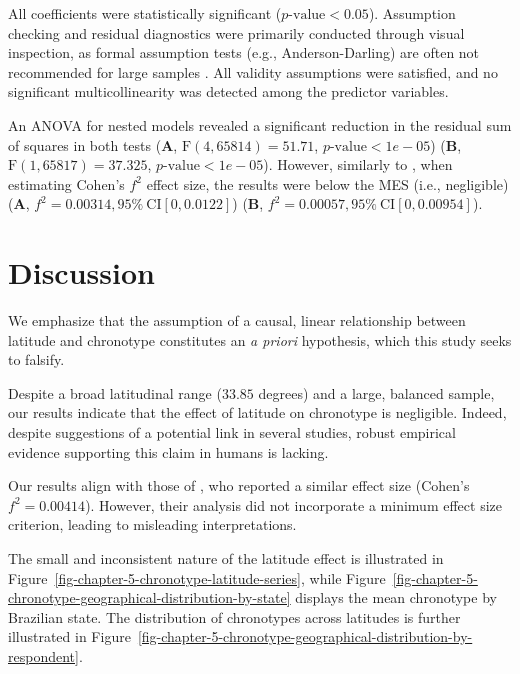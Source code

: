 \documentclass[
12pt,
openright,
oneside,
a4paper,
chapter=TITLE,
section=TITLE,
french,
spanish,
brazil,
english
]{abntex2}
\begin{document}
All coefficients were statistically significant
(\(p\text{-value} < 0.05\)). Assumption checking and residual
diagnostics were primarily conducted through visual inspection, as
formal assumption tests (e.g., Anderson-Darling) are often not
recommended for large samples \autocite{shatz2024}. All validity
assumptions were satisfied, and no significant multicollinearity was
detected among the predictor variables.

An ANOVA for nested models revealed a significant reduction in the
residual sum of squares in both tests (\textbf{A},
\(\text{F}(4, 65814) = 51.71\), \(p\text{-value} < 1e-05\)) (\textbf{B},
\(\text{F}(1, 65817) = 37.325\), \(p\text{-value} < 1e-05\)). However,
similarly to \textcite{leocadio-miguel2017}, when estimating Cohen's
\(f^2\) effect size, the results were below the MES (i.e., negligible)
(\textbf{A}, \(f^2 = 0.00314, 95\% \ \text{CI}[0, 0.0122]\))
(\textbf{B}, \(f^2 = 0.00057, 95\% \ \text{CI}[0, 0.00954]\)).

\section{Discussion}\label{discussion}

We emphasize that the assumption of a causal, linear relationship
between latitude and chronotype constitutes an \emph{a priori}
hypothesis, which this study seeks to falsify.

Despite a broad latitudinal range (\(33.85\) degrees) and a large,
balanced sample, our results indicate that the effect of latitude on
chronotype is negligible. Indeed, despite suggestions of a potential
link in several studies, robust empirical evidence supporting this claim
in humans is lacking.

Our results align with those of \textcite{leocadio-miguel2017}, who
reported a similar effect size (Cohen's \(f^2 = 0.00414\)). However,
their analysis did not incorporate a minimum effect size criterion,
leading to misleading interpretations.

The small and inconsistent nature of the latitude effect is illustrated
in Figure~\ref{fig-chapter-5-chronotype-latitude-series}, while
Figure~\ref{fig-chapter-5-chronotype-geographical-distribution-by-state}
displays the mean chronotype by Brazilian state. The distribution of
chronotypes across latitudes is further illustrated in
Figure~\ref{fig-chapter-5-chronotype-geographical-distribution-by-respondent}.
\end{document}
